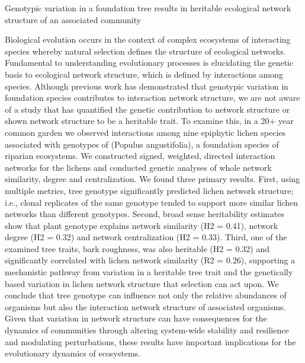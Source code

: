 \documentclass{article}
\title{}
\author{Lau, Matthew K.}
\date{2020-10-12}
\begin{document}
Genotypic variation in a foundation tree results in heritable ecological network structure of an associated community

Biological evolution occurs in the context of complex ecosystems of
interacting species whereby natural selection defines the structure of
ecological networks. Fundamental to understanding evolutionary
processes is elucidating the genetic basis to ecological network
structure, which is defined by interactions among species. Although
previous work has demonstrated that genotypic variation in foundation
species contributes to interaction network structure, we are not aware
of a study that has quantified the genetic contribution to network
structure or shown network structure to be a heritable trait. To
examine this, in a %
%
20+ year common garden we observed interactions among nine epiphytic
lichen species associated with genotypes of (Populus angustifolia), a
foundation species of riparian ecosystems. We constructed signed,
weighted, directed interaction networks for the lichens and conducted
genetic analyses of whole network similarity, degree and
centralization. We found three primary results. First, using multiple
metrics, tree genotype significantly predicted lichen network
structure; i.e., clonal replicates of the same genotype tended to
support more similar lichen networks than different genotypes. Second,
broad sense heritability estimates show that plant genotype explains
network similarity (H2 = 0.41), network degree (H2 = 0.32) and network
centralization (H2 = 0.33). Third, one of the examined tree traits,
bark roughness, was also heritable (H2 = 0.32) and significantly
correlated with lichen network similarity (R2 = 0.26), supporting a
mechanistic pathway from variation in a heritable tree trait and the
genetically based variation in lichen network structure that selection
can act upon. We conclude that tree genotype can influence not only
the relative abundances of organisms but also the interaction network
structure of associated organisms. Given that variation in network
structure can have consequences for the dynamics of communities
through altering system-wide stability and resilience and modulating
perturbations, these results have important implications for the
evolutionary dynamics of ecosystems.
\end{document}
